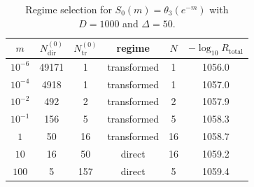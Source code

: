\begin{table}[t]
\centering
\small
\begin{tabular}{c c c c c c}
\hline
$m$ & $N_{\mathrm{dir}}^{(0)}$ & $N_{\mathrm{tr}}^{(0)}$ & regime & $N$ & $-\log_{10}R_{\mathrm{total}}$ \\
\hline
$10^{-6}$ & 49171 & 1 & transformed & 1 & 1056.0 \\
$10^{-4}$ & 4918 & 1 & transformed & 1 & 1057.0 \\
$10^{-2}$ & 492 & 2 & transformed & 2 & 1057.9 \\
$10^{-1}$ & 156 & 5 & transformed & 5 & 1058.3 \\
$1$ & 50 & 16 & transformed & 16 & 1058.7 \\
$10$ & 16 & 50 & direct & 16 & 1059.2 \\
$100$ & 5 & 157 & direct & 5 & 1059.4 \\
\hline
\end{tabular}
\caption{Regime selection for $S_0(m)=\theta_3(e^{-m})$ with $D=1000$ and $\Delta=50$.}
\label{tab:regime-selection-a0}
\end{table}
